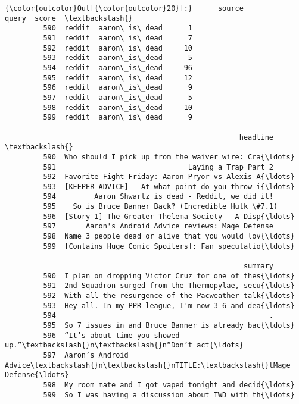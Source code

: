 \documentclass[11pt]{article}
\begin{document}
\begin{Verbatim}[commandchars=\\\{\}]
{\color{outcolor}Out[{\color{outcolor}20}]:}      source          query  score  \textbackslash{}
         590  reddit  aaron\_is\_dead      1   
         591  reddit  aaron\_is\_dead      7   
         592  reddit  aaron\_is\_dead     10   
         593  reddit  aaron\_is\_dead      5   
         594  reddit  aaron\_is\_dead     96   
         595  reddit  aaron\_is\_dead     12   
         596  reddit  aaron\_is\_dead      9   
         597  reddit  aaron\_is\_dead      5   
         598  reddit  aaron\_is\_dead     10   
         599  reddit  aaron\_is\_dead      9   
         
                                                       headline  \textbackslash{}
         590  Who should I pick up from the waiver wire: Cra{\ldots}   
         591                               Laying a Trap Part 2   
         592  Favorite Fight Friday: Aaron Pryor vs Alexis A{\ldots}   
         593  [KEEPER ADVICE] - At what point do you throw i{\ldots}   
         594         Aaron Shwartz is dead - Reddit, we did it!   
         595    So is Bruce Banner Back? (Incredible Hulk \#7.1)   
         596  [Story 1] The Greater Thelema Society - A Disp{\ldots}   
         597       Aaron's Android Advice reviews: Mage Defense   
         598  Name 3 people dead or alive that you would lov{\ldots}   
         599  [Contains Huge Comic Spoilers]: Fan speculatio{\ldots}   
         
                                                        summary  
         590  I plan on dropping Victor Cruz for one of thes{\ldots}  
         591  2nd Squadron surged from the Thermopylae, secu{\ldots}  
         592  With all the resurgence of the Pacweather talk{\ldots}  
         593  Hey all. In my PPR league, I'm now 3-6 and dea{\ldots}  
         594                                                  .  
         595  So 7 issues in and Bruce Banner is already bac{\ldots}  
         596  “It’s about time you showed up.”\textbackslash{}n\textbackslash{}n“Don’t act{\ldots}  
         597  Aaron’s Android Advice\textbackslash{}n\textbackslash{}nTITLE:\textbackslash{}tMage Defense{\ldots}  
         598  My room mate and I got vaped tonight and decid{\ldots}  
         599  So I was having a discussion about TWD with th{\ldots}  
\end{Verbatim}
            
\end{document}
